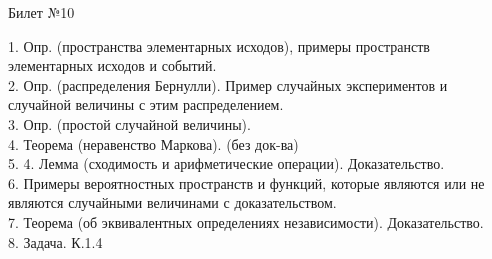 \documentclass[preview]{standalone}
\begin{document}
 
\begin{center} {\Large Билет №10} \end{center} 

1.  Опр. (пространства элементарных исходов), примеры пространств элементарных исходов и событий.\\

2.  Опр. (распределения Бернулли).  Пример случайных экспериментов и случайной величины с этим распределением.\\

3.  Опр. (простой случайной величины).\\

4.  Теорема (неравенство Маркова). (без док-ва)\\

5. 4. Лемма (сходимость и арифметические операции). Доказательство.\\

6.  Примеры вероятностных пространств и функций, которые являются или не являются случайными величинами с доказательством.\\

7.  Теорема (об эквивалентных определениях независимости). Доказательство.\\

8. Задача. К.1.4\\
\end{document}
